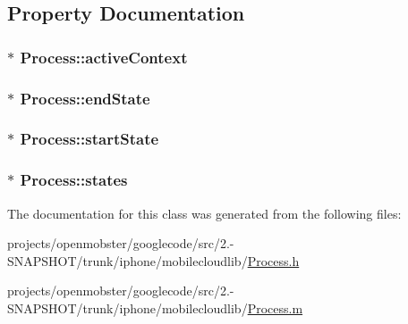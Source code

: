 \subsection{\-Property \-Documentation}
\hypertarget{interface_process_aba0365db90cfa5758c64250c794c67e3}{
\subsubsection[{active\-Context}]{ $\ast$ \-Process\-::active\-Context}}
\label{interface_process_aba0365db90cfa5758c64250c794c67e3}
\hypertarget{interface_process_a7b2577186857e729cad7d09d2b7ae7fe}{
\subsubsection[{end\-State}]{ $\ast$ \-Process\-::end\-State}}
\label{interface_process_a7b2577186857e729cad7d09d2b7ae7fe}
\hypertarget{interface_process_a947149552b6df6c25dd37a8ec5c947be}{
\subsubsection[{start\-State}]{ $\ast$ \-Process\-::start\-State}}
\label{interface_process_a947149552b6df6c25dd37a8ec5c947be}
\hypertarget{interface_process_a19c15a1a025bc71b2402e86c43607321}{
\subsubsection[{states}]{ $\ast$ \-Process\-::states}}
\label{interface_process_a19c15a1a025bc71b2402e86c43607321}


\-The documentation for this class was generated from the following files\-:\begin{DoxyCompactItemize}
\item 
projects/openmobster/googlecode/src/2.-\/\-S\-N\-A\-P\-S\-H\-O\-T/trunk/iphone/mobilecloudlib/\hyperlink{_process_8h}{\-Process.\-h}\item 
projects/openmobster/googlecode/src/2.-\/\-S\-N\-A\-P\-S\-H\-O\-T/trunk/iphone/mobilecloudlib/\hyperlink{_process_8m}{\-Process.\-m}\end{DoxyCompactItemize}
